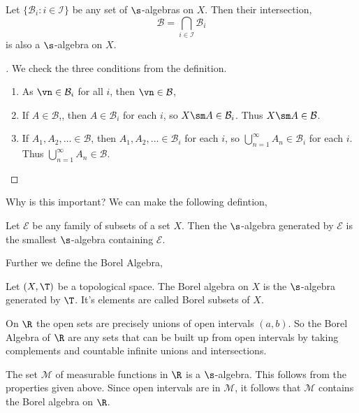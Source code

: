 \begin{nprop}
   Let $\{\mathcal{B}_i : i \in \mathcal{I}\}$ be any set of $\s$-algebras on $X$. Then their intersection,
   $$ \mathcal{B} = \bigcap_{i \in \mathcal{I}} \mathcal{B}_i $$
   is also a $\s$-algebra on $X$.
\end{nprop}
\begin{proof}[]
  We check the three conditions from the definition.
  \begin{enumerate}
    \item As $\vn \in \mathcal{B}_i$ for all $i$, then $\vn \in \mathcal{B}$,
    \item If $A \in \mathcal{B}$,, then $A \in \mathcal{B}_i$ for each $i$, so $X\sm A \in \mathcal{B}_i$. Thus $X\sm A \in \mathcal{B}$.
    \item If $A_1, A_2, \dots \in \mathcal{B}$, then $A_1, A_2, \dots \in \mathcal{B}_i$ for each $i$, so $\bigcup_{n=1}^\infty A_n \in \mathcal{B}_i$ for each $i$. Thus $\bigcup_{n=1}^\infty A_n \in \mathcal{B}$.
  \end{enumerate}
\end{proof}

\noindent
Why is this important? We can make the following defintion,
\begin{ndefi}
  Let $\mathcal{E}$ be any family of subsets of a set $X$. Then the $\s$-algebra generated by $\mathcal{E}$ is the smallest $\s$-algebra containing $\mathcal{E}$.
\end{ndefi}

\noindent
Further we define the Borel Algebra,
\begin{ndefi}
  Let $(X, \T)$ be a topological space. The Borel algebra on $X$ is the $\s$-algebra generated by $\T$. It's elements are called Borel subsets of $X$.
\end{ndefi}

\begin{eg}
  On $\R$ the open sets are precisely unions of open intervals $(a, b)$. So the Borel Algebra of $\R$ are any sets that can be built up from open intervals by taking complements and countable infinite unions and intersections.
\end{eg}

\begin{eg}
  The set $\mathcal{M}$ of measurable functions in $\R$ is a $\s$-algebra. This follows from the properties given above. Since open intervals are in $\mathcal{M}$, it follows that $\mathcal{M}$ contains the Borel algebra on $\R$.
\end{eg}

